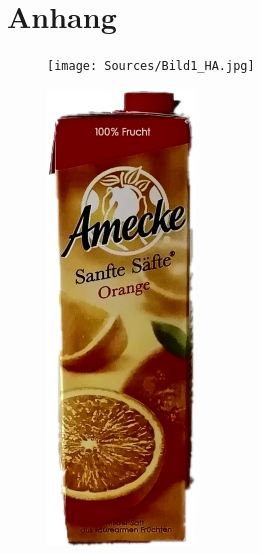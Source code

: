 \documentclass[a4paper,12pt,oneside]{article}
\begin{document}
  \section*{Anhang}
\begin{figure}[htb]
\begin{minipage}[c]{0.2\textwidth}
\texttt{[image: Sources/Bild1\_HA.jpg]}
\end{minipage}
\hfill
\begin{minipage}[c]{0.08\textwidth}
\includegraphics[width=\textwidth]{Sources/Bild1_HA.png}

\end{minipage}
\end{figure}
\end{document}
